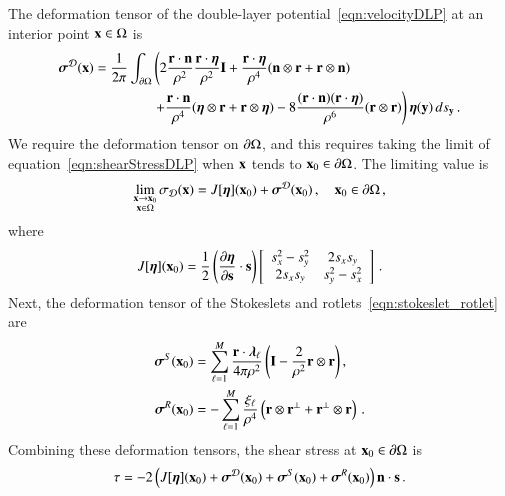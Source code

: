 \documentclass[preprint, 10pt]{elsarticle}
\begin{document}
The deformation tensor of the double-layer
potential~\eqref{eqn:velocityDLP} at an interior point ${\mathbf{x}} \in \Omega$
is~\cite{qua-bir2014a}
\begin{equation}
  \label{eqn:shearStressDLP}
  \begin{aligned}
  {\boldsymbol\sigma}^{\mathcal{D}}({\mathbf{x}}) = \frac{1}{2\pi}\int_{{\partial}\Omega} &\left(
    2\frac{{\mathbf{r}} \cdot {\mathbf{n}}}{\rho^2} \frac{{\mathbf{r}} \cdot {\boldsymbol\eta}}{\rho^2} {\mathbf{I}} + 
    \frac{{\mathbf{r}} \cdot {\boldsymbol\eta}}{\rho^4} ({\mathbf{n}} \otimes {\mathbf{r}} + {\mathbf{r}} \otimes {\mathbf{n}}) 
    \right. \\
    &\left.
    +\frac{{\mathbf{r}} \cdot {\mathbf{n}}}{\rho^4} ({\boldsymbol\eta} \otimes {\mathbf{r}} + {\mathbf{r}} \otimes {\boldsymbol\eta}) - 
    8\frac{({\mathbf{r}} \cdot {\mathbf{n}})({\mathbf{r}} \cdot {\boldsymbol\eta})}{\rho^6}({\mathbf{r}} \otimes {\mathbf{r}})
  \right) {\boldsymbol\eta}({\mathbf{y}}) \, ds_{\mathbf{y}} \, .
  \end{aligned}
\end{equation}
We require the deformation tensor on ${\partial}\Omega$, and this requires
taking the limit of equation~\eqref{eqn:shearStressDLP} when ${\mathbf{x}}$ tends
to ${\mathbf{x}}_0 \in {\partial}\Omega$.  The limiting value is
\begin{align}
  \lim_{\substack{{\mathbf{x}} \rightarrow {\mathbf{x}}_0 \\ {\mathbf{x}} \in \Omega}}\sigma_{\mathcal{D}}({\mathbf{x}}) =
  J[{\boldsymbol\eta}]({\mathbf{x}}_0) + {\boldsymbol\sigma}^{\mathcal{D}}({\mathbf{x}}_0)\, , \quad {\mathbf{x}}_0 \in {\partial}\Omega \, ,
\end{align} 
where
\begin{align}
  J[{\boldsymbol\eta}]({\mathbf{x}}_0) = \frac{1}{2}\left(\frac{\partial {\boldsymbol\eta}}{\partial {\mathbf{s}}} 
    \cdot {\mathbf{s}}\right) \left[ 
  \begin{array}{cc}
    s_x^2 - s_y^2 & 2s_x s_y \\ 2s_x s_y & s_y^2 - s_x^2
  \end{array}\right] \, .
  \label{eqn:shearStressJump}
\end{align}
Next, the deformation tensor of the Stokeslets and
rotlets~\eqref{eqn:stokeslet_rotlet} are
\begin{equation}
  \label{eqn:shearStressSR}
  \begin{aligned}
  {\boldsymbol\sigma}^S({\mathbf{x}}_0) &= \sum_{\ell=1}^{M}
    \frac{{\mathbf{r}} \cdot {\boldsymbol\lambda}_\ell}{4\pi\rho^2} \left(
    {\mathbf{I}} - \frac{2}{\rho^2} {\mathbf{r}} \otimes {\mathbf{r}} \right),  \\
  {\boldsymbol\sigma}^R({\mathbf{x}}_0) &= -\sum_{\ell=1}^M
    \frac{\xi_\ell}{\rho^4} \left({\mathbf{r}} \otimes {\mathbf{r}}^\perp + 
    {\mathbf{r}}^\perp \otimes {\mathbf{r}} \right) \, .
  \end{aligned}
\end{equation}
Combining these deformation tensors, the shear stress at ${\mathbf{x}}_0 \in
{\partial}\Omega$ is
\begin{align}
  \tau = -2 \left(J[{\boldsymbol\eta}]({\mathbf{x}}_0) + {\boldsymbol\sigma}^{\mathcal{D}}({\mathbf{x}}_0) + 
    {\boldsymbol\sigma}^S({\mathbf{x}}_0) + {\boldsymbol\sigma}^R({\mathbf{x}}_0)\right) {\mathbf{n}} \cdot {\mathbf{s}} \, .
  \label{eqn:shearStressLP}
\end{align}
\end{document}

